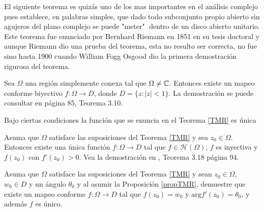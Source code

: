 El siguiente teorema es quizás uno de los mas importantes en el análisis complejo pues establece, en palabras simples, que dado todo subconjunto propio abierto sin agujeros del plano complejo se puede "meter" $\;$dentro de un disco abierto unitario. Este teorema fue enunciado  por Bernhard Riemann en 1851 en su tesis doctoral y aunque Riemann dio una prueba del teorema, esta no resulto ser correcta, no fue sino hasta 1900 cuando William Fogg Osgood dio la primera demostración rigurosa del teorema.

\begin{teor}\label{TMR}
	Sea $\Omega$ una región simplemente conexa tal que $\Omega\neq \mathbb{C}$. Entonces existe un mapeo conforme biyectivo $f: \Omega\rightarrow D$, donde $D =\{ z : |z| < 1 \}$.
	\proof
	La demostración se puede consultar en \cite{tarlok} página 85, Teorema 3.10.\endproof
\end{teor}
Bajo ciertas condiciones la función que se enuncia en el Teorema \ref{TMR} es única
\begin{prop}\label{propTMR}
 Asuma que $\Omega$ satisface las suposiciones del Teorema \ref{TMR} y sea $z_0\in \Omega$. Entonces existe una única función $f:\Omega\rightarrow D$ tal que  $f\in \mathcal{H}(\Omega)$, $f$ es inyectiva y $f(z_0)$ con $f'(z_0)>0$.
 \proof Vea la demostración en  \cite{tarlok}, Teorema 3.18 página 94.\endproof
\end{prop}

\begin{coro}\label{coroRiemman}
	 Asuma que $\Omega$ satisface las suposiciones del Teorema \ref{TMR} y sean $z_0\in \Omega$, $w_0\in D$ y un ángulo $\theta_0$ y al asumir la Proposición \ref{propTMR}, demuestre que existe un mapeo conforme $f:\Omega\rightarrow D$ tal que $f(z_0)=w_0$ y $\mbox{arg}f'(z_0)=\theta_0$, y además $f$ es único.
\end{coro}

